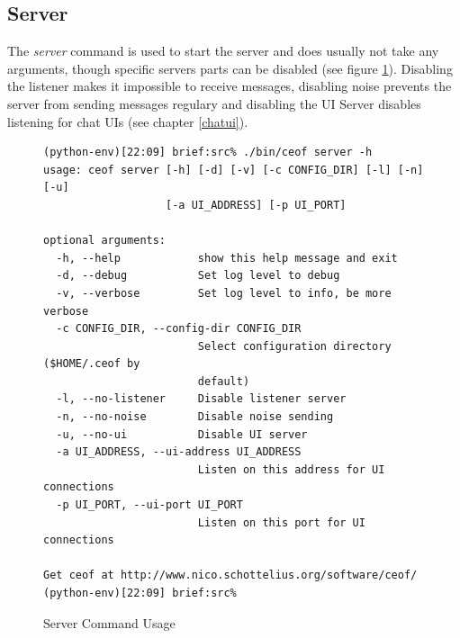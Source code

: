 \subsection{Server}
The \textit{server} command is used to start
the server and does usually not take any arguments,
though specific servers parts can be disabled
(see figure \ref{serverusage}). Disabling the listener
makes it impossible to receive messages, disabling
noise prevents the server from sending messages regulary
and disabling the UI Server disables listening for chat
UIs (see chapter \ref{chatui}).
\begin{figure}[htb]
\caption{Server Command Usage}
\label{serverusage}
\begin{verbatim}
(python-env)[22:09] brief:src% ./bin/ceof server -h
usage: ceof server [-h] [-d] [-v] [-c CONFIG_DIR] [-l] [-n] [-u]
                   [-a UI_ADDRESS] [-p UI_PORT]

optional arguments:
  -h, --help            show this help message and exit
  -d, --debug           Set log level to debug
  -v, --verbose         Set log level to info, be more verbose
  -c CONFIG_DIR, --config-dir CONFIG_DIR
                        Select configuration directory ($HOME/.ceof by
                        default)
  -l, --no-listener     Disable listener server
  -n, --no-noise        Disable noise sending
  -u, --no-ui           Disable UI server
  -a UI_ADDRESS, --ui-address UI_ADDRESS
                        Listen on this address for UI connections
  -p UI_PORT, --ui-port UI_PORT
                        Listen on this port for UI connections

Get ceof at http://www.nico.schottelius.org/software/ceof/
(python-env)[22:09] brief:src% 
\end{verbatim}
\end{figure}
